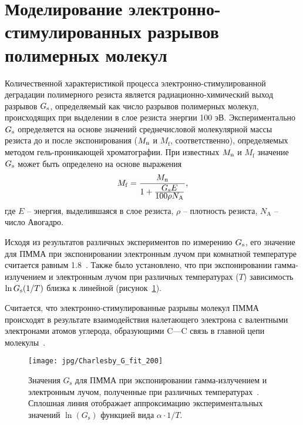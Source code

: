 \section{Моделирование электронно-стимулированных разрывов полимерных молекул} \label{sec:G_value}
Количественной характеристикой процесса электронно-стимулированной деградации полимерного резиста является радиационно-химический выход разрывов $G_\mathrm{s}$, определяемый как число разрывов полимерных молекул, происходящих при выделении в слое резиста энергии 100 эВ.
Экспериментально $G_\mathrm{s}$ определяется на основе значений среднечисловой молекулярной массы резиста до и после экспонирования ($M_\mathrm{n}$ и $M_\mathrm{f}$, соответственно), определяемых методом гель-проникающей хроматографии.
При известных $M_\mathrm{n}$ и $M_\mathrm{f}$ значение $G_\mathrm{s}$ может быть определено на основе выражения~\cite{Greeneich1979_Mf_Mn}
\begin{equation} \label{eq:G_value_Mn_Mf}
	M_\mathrm{f} = \frac{\displaystyle M_\mathrm{n}}{1 + \frac{\displaystyle G_\mathrm{s} E}{\displaystyle 100 \rho N_\mathrm{A}}},
\end{equation}
где $E$ -- энергия, выделившаяся в слое резиста, $\rho$ -- плотность резиста, $N_\mathrm{A}$ -- число Авогадро.

Исходя из результатов различных экспериментов по измерению $G_\mathrm{s}$, его значение для ПММА при экспонировании электронным лучом при комнатной температуре считается равным 1.8~\cite{Charlesby_1964_Gs}. Также было установлено, что при экспонировании гамма-излучением и электронным лучом при различных температурах ($T$) зависимость $\ln G_\mathrm{s} (1/T)$ близка к линейной (рисунок~\ref{fig:Gs_Charlesby}).

Считается, что электронно-стимулированные разрывы молекул ПММА происходят в результате взаимодействия налетающего электрона с валентными электронами атомов углерода, образующими C---C связь в главной цепи молекулы~\cite{Stepanova_2006}.

\begin{figure}[h]
	\begin{center}
		\texttt{[image: jpg/Charlesby\_G\_fit\_200]}
		\caption{Значения $G_\mathrm{s}$ для ПММА при экспонировании гамма-излучением и электронным лучом, полученные при различных температурах~\cite{Charlesby_1964_Gs}. Сплошная линия отображает аппроксимацию экспериментальных значений $\ln(G_\mathrm{s})$ функцией вида $\alpha\cdot1/T$.}
		\label{fig:Gs_Charlesby}
	\end{center}
\end{figure}
